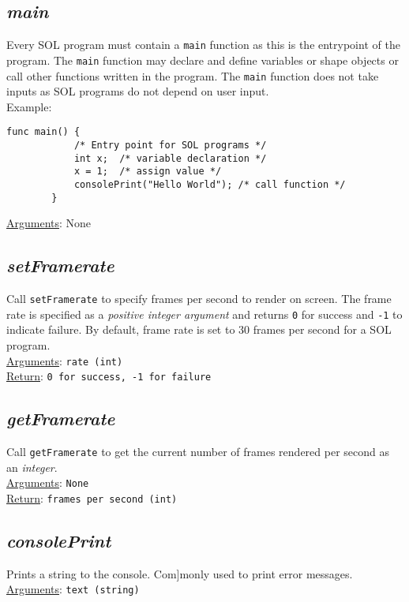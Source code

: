     \subsection{\textit{main}}
    Every SOL program must contain a \texttt{main} function as this is the entrypoint of the program. The \texttt{main} function may declare and define variables or shape objects or call other functions written in the program. The \texttt{main} function does not take inputs as SOL programs do not depend on user input.\\
    Example:\\
    \begin{lstlisting}[style=sol]
        func main() {
            /* Entry point for SOL programs */
            int x;  /* variable declaration */
            x = 1;  /* assign value */
            consolePrint("Hello World"); /* call function */
        }
    \end{lstlisting}
    \underline{Arguments}: None

    \subsection{\textit{setFramerate}}
    Call \texttt{setFramerate} to specify frames per second to render on screen. The frame rate is specified as a \textit{positive integer argument} and returns \texttt{0} for success and \texttt{-1} to indicate failure. By default, frame rate is set to 30 frames per second for a SOL program.\\
    \underline{Arguments}: \texttt{rate (int)}\\
    \underline{Return}: \texttt{0 for success, -1 for failure}

    \subsection{\textit{getFramerate}}
    Call \texttt{getFramerate} to get the current number of frames rendered per second as an \textit{integer}.\\
    \underline{Arguments}: \texttt{None}\\
    \underline{Return}: \texttt{frames per second (int)}

    \subsection{\textit{consolePrint}}
    Prints a string to the console. Com]monly used to print error messages.\\
    \underline{Arguments}: \texttt{text (string)}

